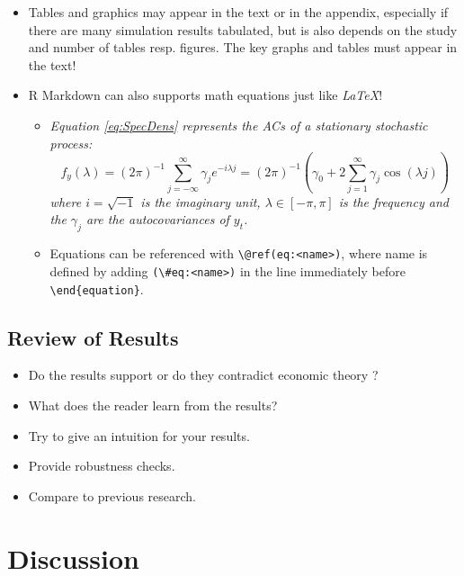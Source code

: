 \documentclass[11pt, a4paper, twosided]{book}
\begin{document}
\begin{itemize}
\item
  Tables and graphics may appear in the text or in the appendix, especially if
  there are many simulation results tabulated, but is also depends on the study
  and number of tables resp. figures. The key graphs and tables must appear in
  the text!
\item
  R Markdown can also supports math equations just like \emph{LaTeX}!
  \begin{itemize}
  \item
    \emph{Equation \eqref{eq:SpecDens} represents the ACs of a stationary
    stochastic process:}
    \begin{equation}
            f_y(\lambda) = (2\pi)^{-1} \sum_{j=-\infty}^{\infty}
                           \gamma_j e^{-i\lambda j}
                         =(2\pi)^{-1}\left(\gamma_0 + 2 \sum_{j=1}^{\infty}
        \gamma_j \cos(\lambda j)\right)
                                       \label{eq:SpecDens}
    \end{equation}
    \emph{where \(i=\sqrt{-1}\) is the imaginary unit, \(\lambda \in [-\pi, \pi]\) is the
    frequency and the \(\gamma_j\) are the autocovariances of \(y_t\).}
  \item
    Equations can be referenced with \texttt{\textbackslash{}@ref(eq:\textless{}name\textgreater{})}, where name is defined
    by adding \texttt{(\textbackslash{}\#eq:\textless{}name\textgreater{})} in the line immediately before \texttt{\textbackslash{}end\{equation\}}.
  \end{itemize}
\end{itemize}
\hypertarget{review-of-results}{%
\section{Review of Results}\label{review-of-results}}
\begin{itemize}
\item
  Do the results support or do they contradict economic theory ?
\item
  What does the reader learn from the results?
\item
  Try to give an intuition for your results.
\item
  Provide robustness checks.
\item
  Compare to previous research.
\end{itemize}
\hypertarget{discussion-3}{%
\chapter{Discussion}\label{discussion-3}}
\end{document}
